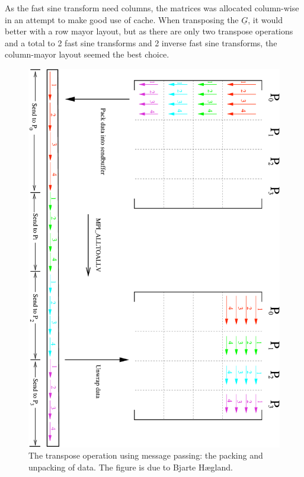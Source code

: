 As the fast sine transform need columns, the matrices was allocated column-wise in an attempt to make good use of cache. When transposing the $\underline{G}$, it would better with a row mayor layout, but as there are only two transpose operations and a total to 2 fast sine transforms and 2 inverse fast sine transforms, the column-mayor layout seemed the best choice. \\ 
%
\begin{figure}[h!]
\begin{center}
    \includegraphics[angle=90,scale=0.35]{./Figures/matrix_blocktranspose.pdf}
\end{center}
\caption{The transpose operation using message passing: the packing and unpacking of data. The figure is due to Bjarte Hægland.}
\label{fig:mpisend}
\end{figure}

